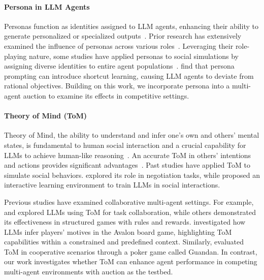 \paragraph{Persona in LLM Agents}\;
Personas function as identities assigned to LLM agents, enhancing their ability to generate personalized or specialized outputs~\cite{xu2024character, chen2024from, sun2024building, li2025helloagainllmpoweredpersonalized}. Prior research has extensively examined the influence of personas across various roles~\cite{hu-collier-2024-quantifying, samuel2024personagymevaluatingpersonaagents, kim2024persona, dong-etal-2024-llm}. Leveraging their role-playing nature, some studies have applied personas to social simulations by assigning diverse identities to entire agent populations~\cite{lee2024language, tseng-etal-2024-two, hu2024quantifying}. \citet{yang2024} find that persona prompting can introduce shortcut learning, causing LLM agents to deviate from rational objectives.  
Building on this work, we incorporate persona into a multi-agent auction to examine its effects in competitive settings.

\vspace{-0.05in}
\paragraph{Theory of Mind (ToM)}\;\;
Theory of Mind, the ability to understand and infer one's own and others' mental states, is fundamental to human social interaction and a crucial capability for LLMs to achieve human-like reasoning~\cite{leslie2004core, sap-etal-2022-neural, van-duijn-etal-2023-theory, cross2024hypothetical, chan-etal-2024-negotiationtom}. An accurate ToM in others' intentions and actions provides significant advantages~\cite{street2024llm, amirizaniani2024llms}. Past studies have applied ToM to simulate social behaviors. \citet{de2017negotiating} explored its role in negotiation tasks, while \citet{wang-etal-2024-sotopia} proposed an interactive learning environment to train LLMs in social interactions. 

Previous studies have examined collaborative multi-agent settings. For example, \citet{li2023camel} and \citet{Li_2023} explored LLMs using ToM for task collaboration, while others demonstrated its effectiveness in structured games with rules and rewards. \citet{light2023avalonbench} investigated how LLMs infer players' motives in the Avalon board game, highlighting ToM capabilities within a constrained and predefined context. Similarly, \citet{yim2024evaluating} evaluated ToM in cooperative scenarios through a poker game called Guandan. In contrast, our work investigates whether ToM can enhance agent performance in competing multi-agent environments with auction as the testbed.